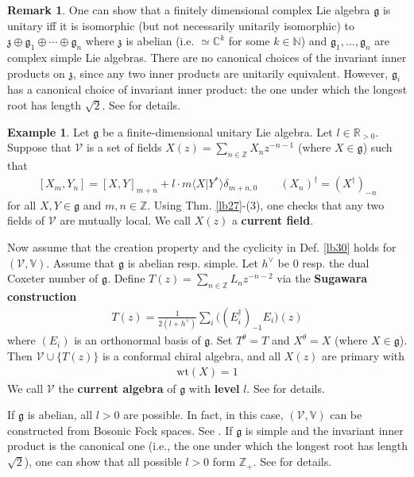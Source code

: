 \documentclass[12pt,b5paper,notitlepage]{article}
\theoremstyle{definition}
\newtheorem{eg}[df]{Example}
\newtheorem{rem}[df]{Remark}
\theoremstyle{plain}
\newcommand{\mc}{\mathcal}
\newcommand{\bk}[1]{\langle {#1}\rangle}
\newcommand{\gk}{\mathfrak g}
\newcommand{\zk}{\mathfrak z}
\newcommand{\Vbb}{\mathbb V}
\newcommand{\Cbb}{\mathbb C}
\newcommand{\Nbb}{\mathbb N}
\newcommand{\Zbb}{\mathbb Z}
\newcommand{\Rbb}{\mathbb R}
\newcommand{\wt}{\mathrm{wt}}
\numberwithin{equation}{section}
\begin{document}
\begin{rem}
One can show that a finitely dimensional complex Lie algebra $\gk$ is unitary iff it is isomorphic (but not necessarily unitarily isomorphic) to $\zk\oplus\gk_1\oplus\cdots\oplus\gk_n$ where $\zk$ is abelian (i.e. $\simeq \Cbb^k$ for some $k\in\Nbb$) and $\gk_1,\dots,\gk_n$ are complex simple Lie algebras. There are no canonical choices of the invariant inner products on $\zk$, since any two inner products are unitarily equivalent. However, $\gk_i$ has a canonical choice of invariant inner product: the one under which the longest root has length $\sqrt 2$. See \cite[Ch. II]{Was-10} for details. 
\end{rem}


\begin{eg}\label{lb41}
Let $\gk$ be a finite-dimensional unitary Lie algebra. Let $l\in\Rbb_{>0}$. Suppose that $\mc V$ is a set of fields $X(z)=\sum_{n\in\Zbb}X_nz^{-n-1}$ (where $X\in\gk$) such that 
\begin{align}\label{eq68}
[X_m,Y_n]=[X,Y]_{m+n}+l\cdot m\bk{X|Y^*}\delta_{m+n,0}\qquad (X_n)^\dagger=(X^\dagger)_{-n}
\end{align}
for all $X,Y\in\gk$ and $m,n\in\Zbb$. Using Thm. \ref{lb27}-(3), one checks that any two fields of $\mc V$ are mutually local. We call $X(z)$ a \textbf{current field}. 


Now assume that the creation property and the cyclicity in Def. \ref{lb30} holds for $(\mc V,\Vbb)$. Assume that $\gk$ is abelian resp. simple. Let $h^\vee$ be $0$ resp. the dual Coxeter number of $\gk$. Define $T(z)=\sum_{n\in\Zbb}L_nz^{-n-2}$ via the \textbf{Sugawara construction}
\begin{align}
T(z)=\frac 1{2(l+h^\vee)}\sum_{i} \big((E_i^\dagger)_{-1}E_i\big)(z)
\end{align}
where $(E_i)$ is an orthonormal basis of $\gk$. Set $T^\theta=T$ and $X^\theta=X$ (where $X\in\gk$). Then $\mc V\cup\{T(z)\}$ is a conformal chiral algebra, and all $X(z)$ are primary with
\begin{align*}
\wt(X)=1
\end{align*}
We call $\mc V$ the \textbf{current algebra}  of $\gk$ with \textbf{level}  $l$. See \cite[Sec. 6]{Gui-V} for details.


If $\gk$ is abelian, all $l>0$ are possible. In fact, in this case, $(\mc V,\Vbb)$ can be constructed from Bosonic Fock spaces. See \cite[Subsec. 6.13]{Gui-V}. If $\gk$ is simple and the invariant inner product is the canonical one (i.e., the one under which the longest root has length $\sqrt 2$), one can show that all possible $l>0$ form $\Zbb_+$. See \cite[Ch. III]{Was-10} for details.   \hfill\qedsymbol 
\end{eg}
\end{document}
